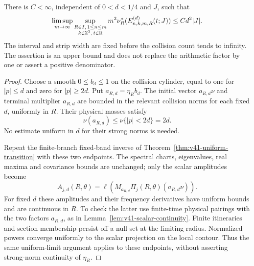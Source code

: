 \begin{lemma}
\label{lem:v45-two-strip-local}
There is $C<\infty$, independent of $0<d<1/4$ and $J$, such that
\begin{equation}\label{eq:v45-two-strip-local}
 \limsup_{m\to\infty}\sup_{\substack{R\in I,\,1\le n\le m\\
                                     k\in\Z^2,\,t\in\R}}
       m^2\nu_R^*(E^{(d)}_{n,k,m,R}(t;J))
                       \le C d^2|J|.
\end{equation}
The interval and strip width are fixed before the collision count tends
to infinity. The assertion is an upper bound and does not replace the
arithmetic factor by one or assert a positive denominator.
\end{lemma}
\begin{proof}
Choose a smooth $0\le b_d\le1$ on the collision cylinder, equal to
one for $|p|\le d$ and zero for $|p|\ge2d$. Put $a_{R,d}=\eta_Rb_d$.
The initial vector $a_{R,d}\nu$ and terminal multiplier $a_{R,d}$ are
bounded in the relevant collision norms for each fixed $d$, uniformly
in $R$. Their physical masses satisfy
\begin{equation}\label{eq:v45-small-endpoint-mass}
 \nu(a_{R,d})\le\nu\{|p|<2d\}=2d.
\end{equation}
No estimate uniform in $d$ for their strong norms is needed.

Repeat the finite-branch fixed-band inverse of
Theorem~\ref{thm:v41-uniform-transition} with these two endpoints.
The spectral charts, eigenvalues, real maxima and covariance bounds
are unchanged; only the scalar amplitudes become
\[
 A_{j,d}(R,\theta)=
     \ell(M_{a_{R,d}}\Pi_j(R,\theta)(a_{R,d}\nu)).
\]
For fixed $d$ these amplitudes and their frequency derivatives have
uniform bounds and are continuous in $R$. To check the latter use
finite-time physical pairings with the two factors $a_{R,d}$, as in
Lemma~\ref{lem:v41-scalar-continuity}. Finite itineraries and section
membership persist off a null set at the limiting radius. Normalized
powers converge uniformly to the scalar projection on the local
contour. Thus the same uniform-limit argument applies to these
endpoints, without asserting strong-norm continuity of $\eta_R$.


\end{proof}
